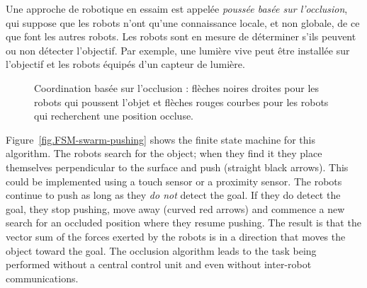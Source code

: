 Une approche de robotique en essaim est appelée \emph{poussée basée sur l'occlusion}, qui suppose que les robots n'ont qu'une connaissance locale, et non globale, de ce que font les autres robots. Les robots sont en mesure de déterminer s'ils peuvent ou non détecter l'objectif. Par exemple, une lumière vive peut être installée sur l'objectif et les robots équipés d'un capteur de lumière. 

\begin{figure}
\begin{center}
\end{center}
\caption{Coordination basée sur l'occlusion : flèches noires droites pour les robots qui poussent l'objet et flèches rouges courbes pour les robots qui recherchent une position occluse.}\label{fig.swarm-pushing}
\end{figure}

Figure~\ref{fig.FSM-swarm-pushing} shows the finite state machine for this algorithm. The robots search for the object; when they find it they place themselves perpendicular to the surface and push (straight black arrows). This could be implemented using a touch sensor or a proximity sensor. The robots continue to push as long as they \emph{do not} detect the goal. If they do detect the goal, they stop pushing, move away (curved red arrows) and commence a new search for an occluded position where they resume pushing. The result is that the vector sum of the forces exerted by the robots is in a direction that moves the object toward the goal. The occlusion algorithm leads to the task being performed without a central control unit and even without inter-robot communications.

